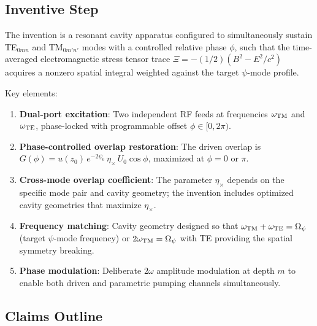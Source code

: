 \documentclass[11pt,a4paper]{article}
\begin{document}
\subsection{Inventive Step}

The invention is a resonant cavity apparatus configured to
simultaneously sustain TE$_{0mn}$ and TM$_{0m'n'}$ modes with a
controlled relative phase $\phi$, such that the time-averaged
electromagnetic stress tensor trace $\Xi = -(1/2)(B^2 - E^2/c^2)$
acquires a nonzero spatial integral weighted against the target
$\psi$-mode profile.

Key elements:
\begin{enumerate}[nosep]
\item \textbf{Dual-port excitation}: Two independent RF feeds
at frequencies $\omega_{\rm TM}$ and $\omega_{\rm TE}$,
phase-locked with programmable offset $\phi \in [0, 2\pi)$.
\item \textbf{Phase-controlled overlap restoration}: The driven
overlap is $G(\phi) = u(z_0)\,e^{-2\psi_0}\,\eta_\times\,U_0
\cos\phi$, maximized at $\phi = 0$ or $\pi$.
\item \textbf{Cross-mode overlap coefficient}: The parameter
$\eta_\times$ depends on the specific mode pair and cavity
geometry; the invention includes optimized cavity geometries
that maximize $\eta_\times$.
\item \textbf{Frequency matching}: Cavity geometry designed so
that $\omega_{\rm TM} + \omega_{\rm TE} = \Omega_\psi$
(target $\psi$-mode frequency) or $2\omega_{\rm TM} =
\Omega_\psi$ with TE providing the spatial symmetry breaking.
\item \textbf{Phase modulation}: Deliberate $2\omega$
amplitude modulation at depth $m$ to enable both driven
and parametric pumping channels simultaneously.
\end{enumerate}

\subsection{Claims Outline}
\end{document}
